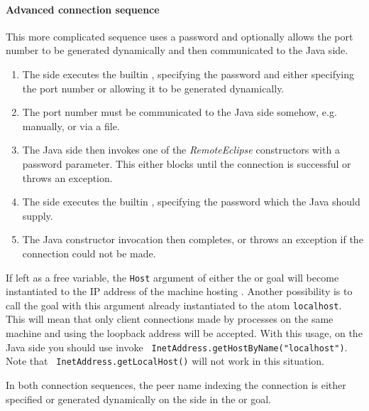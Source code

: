 \paragraph{Advanced connection sequence}
This more complicated sequence uses a password and optionally allows
the port number to be generated dynamically and then communicated to
the Java side.
\begin{enumerate}
  \item The {\eclipse} side executes the builtin , specifying the password and either
	specifying the port number or allowing it to be generated
	dynamically.

  \item The port number must be communicated to the Java side somehow,
  	e.g. manually, or via a file.

  \item The Java side then invokes one of the {\it RemoteEclipse}
	constructors with a password parameter. This either blocks
	until the connection is successful or throws an exception.

  \item The {\eclipse} side executes the builtin , specifying the password which the
  	Java should supply.

  \item The Java constructor invocation then completes, or throws an
	exception if the connection could not be made.
\end{enumerate}

If left as a free variable, the {\tt Host} argument of either the  or  goal will become
instantiated to the IP address of the machine hosting
{\eclipse}. Another possibility is to call the goal with this argument
already instantiated to the atom {\tt localhost}. This will mean that
only client connections made by processes on the same machine and
using the loopback address will be accepted. With this usage, on the
Java side you should use invoke {\tt
InetAddress.getHostByName("localhost")}. Note that {\tt
InetAddress.getLocalHost()} will not work in this situation.

In both connection sequences, the peer name indexing the connection is
either specified or generated dynamically on the {\eclipse} side in
the  or  goal.

